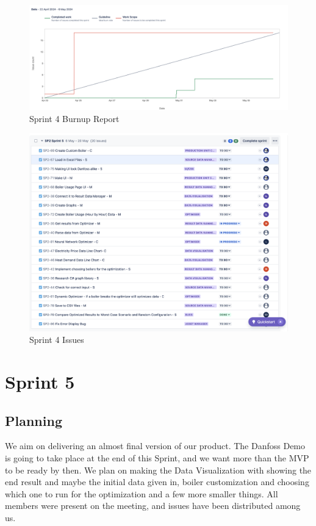 \documentclass[12pt]{report}
\begin{document}
\begin{figure}[H]
  \centering
  \includegraphics[width=1\textwidth]{Resources/4-Sprint/Review/Burndown.png}
  \caption{Sprint 4 Burnup Report}
  \label{fig:S4Burndown-image}
\end{figure}

\begin{figure}[H]
  \centering
  \includegraphics[width=1\textwidth]{Resources/4-Sprint/Review/Issues.png}
  \caption{Sprint 4 Issues}
  \label{fig:S4Issues-image}
\end{figure}







\section {Sprint 5}
\subsection*{Planning}
We aim on delivering an almost final version of our product. The Danfoss Demo is going to take place at the end of this Sprint, and we want more than the MVP to be ready by then. We plan on making the Data Visualization with showing the end result and maybe the initial data given in, boiler customization and choosing which one to run for the optimization and a few more smaller things. All members were present on the meeting, and issues have been distributed among us.
\end{document}
